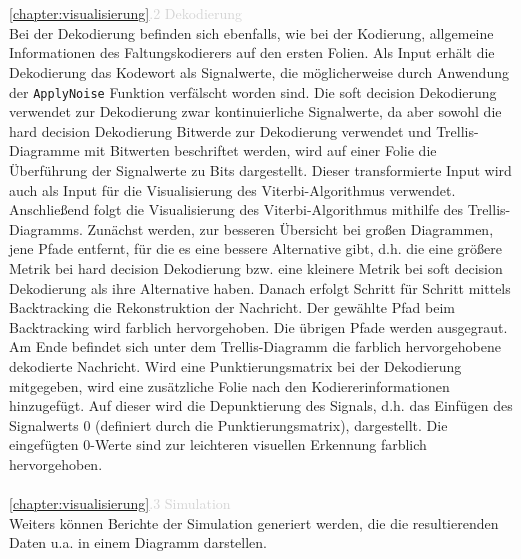 \\\\
\textcolor{lightgray}{\ref{chapter:visualisierung}.2 Dekodierung}\\
Bei der Dekodierung befinden sich ebenfalls, wie bei der Kodierung, allgemeine Informationen des Faltungskodierers auf den ersten Folien.
Als Input erhält die Dekodierung das Kodewort als Signalwerte, die möglicherweise durch Anwendung der \texttt{ApplyNoise} Funktion verfälscht worden sind. Die soft decision Dekodierung verwendet zur Dekodierung zwar kontinuierliche Signalwerte, da aber sowohl die hard decision Dekodierung Bitwerde zur Dekodierung verwendet und Trellis-Diagramme mit Bitwerten beschriftet werden, wird auf einer Folie die Überführung der Signalwerte zu Bits dargestellt. Dieser transformierte Input wird auch als Input für die Visualisierung des Viterbi-Algorithmus verwendet.
Anschließend folgt die Visualisierung des Viterbi-Algorithmus mithilfe des Trellis-Diagramms. Zunächst werden, zur besseren Übersicht bei großen Diagrammen, jene Pfade entfernt, für die es eine bessere Alternative gibt, d.h. die eine größere Metrik bei hard decision Dekodierung bzw. eine kleinere Metrik bei soft decision Dekodierung als ihre Alternative haben. Danach erfolgt Schritt für Schritt mittels Backtracking die Rekonstruktion der Nachricht. Der gewählte Pfad beim Backtracking wird farblich hervorgehoben. Die übrigen Pfade werden ausgegraut. Am Ende befindet sich unter dem Trellis-Diagramm die farblich hervorgehobene dekodierte Nachricht.
Wird eine Punktierungsmatrix bei der Dekodierung mitgegeben, wird eine zusätzliche Folie nach den Kodiererinformationen hinzugefügt. Auf dieser wird die Depunktierung des Signals, d.h. das Einfügen des Signalwerts 0 (definiert durch die Punktierungsmatrix), dargestellt. Die eingefügten 0-Werte sind zur leichteren visuellen Erkennung farblich hervorgehoben.
\\\\
\textcolor{lightgray}{\ref{chapter:visualisierung}.3 Simulation}\\
Weiters können Berichte der Simulation generiert werden, die die resultierenden Daten u.a. in einem Diagramm darstellen.